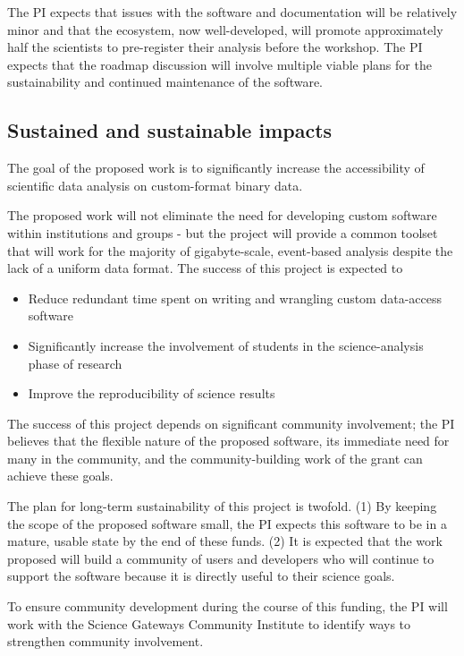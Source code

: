 The PI expects that issues with the software and documentation will be relatively minor and that the ecosystem, now well-developed, will promote approximately half the scientists to pre-register their analysis before the workshop.  The PI expects that the roadmap discussion will involve multiple viable plans for the sustainability and continued maintenance of the software. 

\subsection{Sustained and sustainable impacts}

The goal of the proposed work is to significantly increase the accessibility of scientific data analysis on custom-format binary data.

The proposed work will not eliminate the need for developing custom software within institutions and groups - but the project will provide a common toolset that will work for the majority of gigabyte-scale, event-based analysis despite the lack of a uniform data format.  The success of this project is expected to

\begin{itemize}
    \item Reduce redundant time spent on writing and wrangling custom data-access software
    \item Significantly increase the involvement of students in the science-analysis phase of research
    \item Improve the reproducibility of science results 
\end{itemize}

The success of this project depends on significant community involvement; the PI believes that the flexible nature of the proposed software, its immediate need for many in the community, and the community-building work of the grant can achieve these goals.

The plan for long-term sustainability of this project is twofold.  (1) By keeping the scope of the proposed software small, the PI expects this software to be in a mature, usable state by the end of these funds.   (2) It is expected that the work proposed will build a community of users and developers who will continue to support the software because it is directly useful to their science goals.

To ensure community development during the course of this funding, the PI will work with the Science Gateways Community Institute to identify ways to strengthen community involvement.
